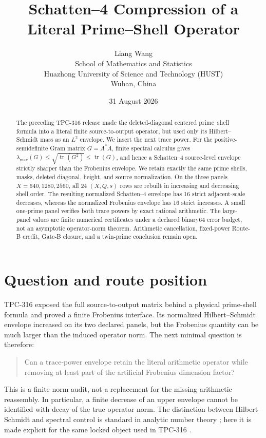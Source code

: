 \documentclass[10pt,a4paper]{article}
\title{Schatten--4 Compression of a Literal Prime--Shell Operator}
\author{Liang Wang\\
School of Mathematics and Statistics\\
Huazhong University of Science and Technology (HUST)\\
Wuhan, China}
\date{31 August 2026}
\newcommand{\tr}{\operatorname{tr}}
\begin{document}
\maketitle

\begin{abstract}
The preceding TPC-316 release made the deleted-diagonal centered prime--shell
formula into a literal finite source-to-output operator, but used only its
Hilbert--Schmidt mass as an $L^2$ envelope.  We insert the next trace power.
For the positive-semidefinite Gram matrix $G=A^*A$, finite spectral calculus
gives
\(
\lambda_{\max}(G)\leq\sqrt{\tr(G^2)}\leq\tr(G)
\), and hence a Schatten--4 source-level envelope strictly sharper than the
Frobenius envelope.  We retain exactly the same prime shells, masks, deleted
diagonal, height, and source normalization.  On the three panels
$X=640,1280,2560$, all 24 $(X,Q,s)$ rows are rebuilt in increasing and
decreasing shell order.  The resulting normalized Schatten--4 envelope has
16 strict adjacent-scale decreases, whereas the normalized Frobenius envelope
has 16 strict increases.  A small one-prime panel verifies both trace powers
by exact rational arithmetic.  The large-panel values are finite numerical
certificates under a declared binary64 error budget, not an asymptotic
operator-norm theorem.  Arithmetic cancellation, fixed-power Route-B credit,
Gate-B closure, and a twin-prime conclusion remain open.
\end{abstract}

\section{Question and route position}

TPC-316 exposed the full source-to-output matrix behind a physical prime-shell
formula and proved a finite Frobenius interface.  Its normalized
Hilbert--Schmidt envelope increased on its two declared panels, but the
Frobenius quantity can be much larger than the induced operator norm.  The
next minimal question is therefore:

\begin{quote}
Can a trace-power envelope retain the literal arithmetic operator while
removing at least part of the artificial Frobenius dimension factor?
\end{quote}

This is a finite norm audit, not a replacement for the missing arithmetic
reassembly.  In particular, a finite decrease of an upper envelope cannot be
identified with decay of the true operator norm.  The distinction between
Hilbert--Schmidt and spectral control is standard in analytic number theory
\cite{montgomeryvaughan,iwankow}; here it is made explicit for the same locked
object used in TPC-316 \cite{tpc316}.
\end{document}
